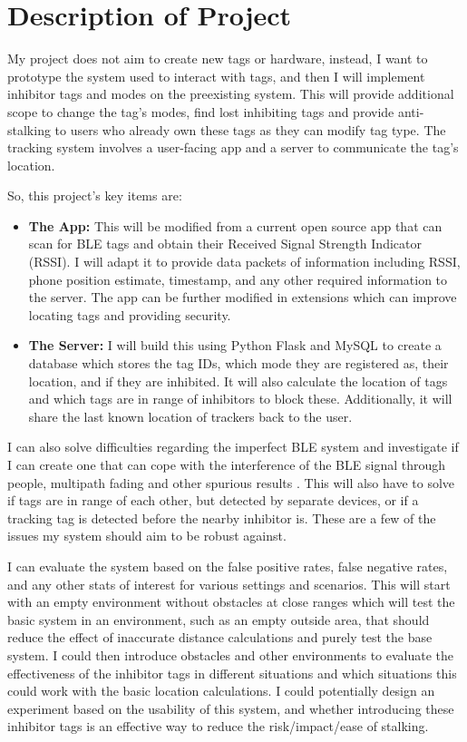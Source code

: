 \documentclass{article}
\begin{document}
\section{Description of Project}


My project does not aim to create new tags or hardware, instead, I want to prototype the system used to interact with tags, and then I will implement inhibitor tags and modes on the preexisting system. This will provide additional scope to change the tag's modes, find lost inhibiting tags and provide anti-stalking to users who already own these tags as they can modify tag type.
The tracking system involves a user-facing app and a server to communicate the tag's location.


So, this project's key items are:
\begin{itemize}
\item{ {\bf The App:} This will be modified from a current open source app  that can scan for BLE tags and obtain their Received Signal Strength Indicator (RSSI). I will adapt it to provide data packets of information including RSSI, phone position estimate, timestamp, and any other required information to the server. The app can be further modified in extensions which can improve locating tags and providing security.}


\item{{\bf The Server:} I will build this using Python Flask and MySQL to create a database which stores the tag IDs, which mode they are registered as, their location, and if they are inhibited. It will also calculate the location of tags and which tags are in range of inhibitors to block these. Additionally, it will share the last known location of trackers back to the user.}

\end{itemize}

I can also solve difficulties regarding the imperfect BLE system and investigate if I can create one that can cope with the interference of the BLE signal through people, multipath fading and other spurious results \cite{AccuracyBLE}. This will also have to solve if tags are in range of each other, but detected by separate devices, or if a tracking tag is detected before the nearby inhibitor is. These are a few of the issues my system should aim to be robust against.


I can evaluate the system based on the false positive rates, false negative rates, and any other stats of interest for various settings and scenarios. This will start with an empty environment without obstacles at close ranges which will test the basic system in an environment, such as an empty outside area, that should reduce the effect of inaccurate distance calculations and purely test the base system. I could then introduce obstacles and other environments to evaluate the effectiveness of the inhibitor tags in different situations and which situations this could work with the basic location calculations. I could potentially design an experiment based on the usability of this system, and whether introducing these inhibitor tags is an effective way to reduce the risk/impact/ease of stalking.
\end{document}

